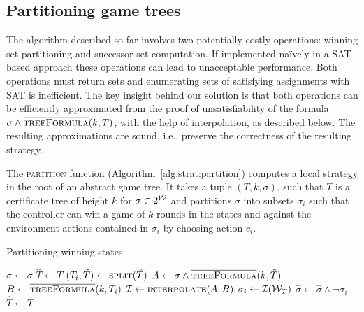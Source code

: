 \subsection{Partitioning game trees}

The algorithm described so far involves two potentially costly operations: winning set partitioning and successor set computation.  If implemented na\"ively in a SAT based approach these operations can lead to unacceptable performance. Both operations must return sets and enumerating sets of satisfying assignments with SAT is inefficient. The key insight behind our solution is that both operations can be efficiently approximated from the proof of unsatisfiability of the formula $\sigma \land \textsc{$\overline{\mbox{treeFormula}}$}(k, T)$, with the help of interpolation, as described below.  The resulting approximations are sound, i.e., preserve the correctness of the resulting strategy.

The \textsc{partition} function (Algorithm~\ref{alg:strat:partition}) computes a local strategy in the root of an abstract game tree.  It takes a tuple $(T, k, \sigma)$, such that $T$ is a certificate tree of height $k$ for $\sigma \in 2^{\mathcal{W}}$ and partitions $\sigma$ into subsets $\sigma_i$ such that the controller can win a game of $k$ rounds in the states and against the environment actions contained in $\sigma_i$ by choosing action $c_i$.

\begin{algorithm}[t]
   \caption{Partitioning winning states}\label{alg:strat:partition}
   \begin{algorithmic}[1]
        \State $\hat{\sigma} \gets \sigma$
        \State $\hat{T} \gets T$
        \State $(T_i, \tilde{T}) \gets \Call{split}{\hat{T}}$\label{alg:partition:split}
            \State $A \gets \sigma \land \Call{\opptf}{k, \tilde{T}} $ \label{alg:strat:partition:Bi}
            \State $B \gets \Call{\opptf}{k, T_i} $ \label{alg:strat:partition:Ai}
            \State $\mathcal{I} \gets \Call{interpolate}{A, B}$\label{alg:partition:I}
            \State $\sigma_i \gets \mathcal{I}(\mathcal{W}_T)$\label{alg:partition:Ii}
            \State $\hat{\sigma} \gets \hat{\sigma} \land \neg \sigma_i$
            \State $\hat{T} \gets \tilde{T}$\label{alg:partition:upd}
        \EndFor
        \State {} \label{alg:strat:partition:return}
        \EndFunction
    \end{algorithmic}
\end{algorithm}

